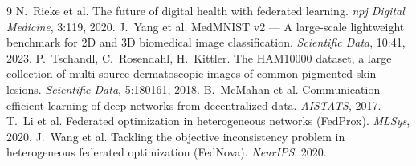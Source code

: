 \documentclass[10pt,a4paper,twocolumn]{article}
\begin{document}
{\footnotesize
\begin{thebibliography}{9}
\setlength{\itemsep}{0pt}
 N.~Rieke et al. The future of digital health with federated learning. \emph{npj Digital Medicine}, 3:119, 2020.
 J.~Yang et al. MedMNIST v2 --- A large-scale lightweight benchmark for 2D and 3D biomedical image classification. \emph{Scientific Data}, 10:41, 2023.
 P.~Tschandl, C.~Rosendahl, H.~Kittler. The HAM10000 dataset, a large collection of multi-source dermatoscopic images of common pigmented skin lesions. \emph{Scientific Data}, 5:180161, 2018.
 B.~McMahan et al. Communication-efficient learning of deep networks from decentralized data. \emph{AISTATS}, 2017.
 T.~Li et al. Federated optimization in heterogeneous networks (FedProx). \emph{MLSys}, 2020.
 J.~Wang et al. Tackling the objective inconsistency problem in heterogeneous federated optimization (FedNova). \emph{NeurIPS}, 2020.
\end{thebibliography}
}
\end{document}
